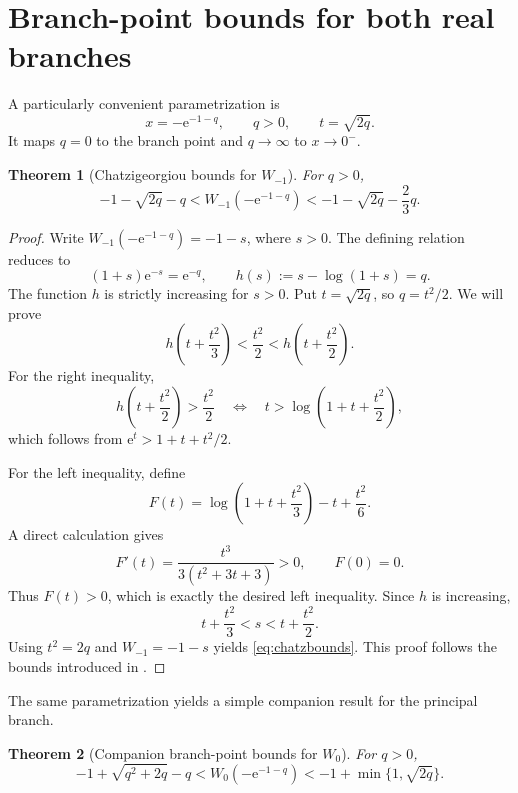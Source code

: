 \documentclass[11pt,openany]{book}
\newcommand{\e}{\mathrm{e}}
\theoremstyle{plain}
\newtheorem{theorem}{Theorem}[chapter]
\theoremstyle{definition}
\theoremstyle{remark}
\begin{document}
\section{Branch-point bounds for both real branches}
A particularly convenient parametrization is
\begin{equation}\label{eq:qparameter}
         x=-\e^{-1-q},\qquad q>0,
         \qquad t=\sqrt{2q}.
\end{equation}
It maps \(q=0\) to the branch point and \(q\to\infty\) to \(x\to0^-\).

\begin{theorem}[Chatzigeorgiou bounds for \(W_{-1}\)]
\label{thm:chatzbounds}
For \(q>0\),
\begin{equation}\label{eq:chatzbounds}
 -1-\sqrt{2q}-q
 <W_{-1}(-\e^{-1-q})
 <-1-\sqrt{2q}-\frac23q.
\end{equation}
\end{theorem}

\begin{proof}
Write \(W_{-1}(-\e^{-1-q})=-1-s\), where \(s>0\).  The defining relation
reduces to
\[
      (1+s)\e^{-s}=\e^{-q},
      \qquad
      h(s):=s-\log(1+s)=q.
\]
The function \(h\) is strictly increasing for \(s>0\).  Put
\(t=\sqrt{2q}\), so \(q=t^2/2\).  We will prove
\[
 h\left(t+\frac{t^2}{3}\right)<\frac{t^2}{2}
 <h\left(t+\frac{t^2}{2}\right).
\]
For the right inequality,
\[
 h\left(t+\frac{t^2}{2}\right)>\frac{t^2}{2}
 \quad\Longleftrightarrow\quad
 t>\log\left(1+t+\frac{t^2}{2}\right),
\]
which follows from \(\e^t>1+t+t^2/2\).

For the left inequality, define
\[
 F(t)=\log\left(1+t+\frac{t^2}{3}\right)-t+\frac{t^2}{6}.
\]
A direct calculation gives
\[
       F'(t)=\frac{t^3}{3(t^2+3t+3)}>0,
       \qquad F(0)=0.
\]
Thus \(F(t)>0\), which is exactly the desired left inequality.  Since
\(h\) is increasing,
\[
       t+\frac{t^2}{3}<s<t+\frac{t^2}{2}.
\]
Using \(t^2=2q\) and \(W_{-1}=-1-s\) yields
\eqref{eq:chatzbounds}.  This proof follows the bounds introduced in
\cite{Chatzigeorgiou2013}.
\end{proof}

The same parametrization yields a simple companion result for the principal
branch.

\begin{theorem}[Companion branch-point bounds for \(W_0\)]
\label{thm:w0qbounds}
For \(q>0\),
\begin{equation}\label{eq:w0qbounds}
 -1+\sqrt{q^2+2q}-q
 <W_0(-\e^{-1-q})
 <-1+\min\{1,\sqrt{2q}\}.
\end{equation}
\end{theorem}
\end{document}
